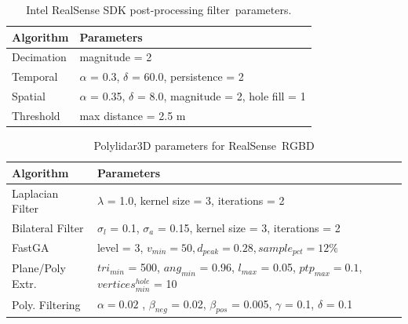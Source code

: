 \begin{table}[H]
\centering
\caption{Intel RealSense SDK post-processing filter~parameters.}\label{table:ch3_realsense_parameters}
\begin{tabular}{@{}ll@{}}
\toprule
\textbf{Algorithm}        & \textbf{Parameters}                                                          \\ \midrule
Decimation     & magnitude = 2   \\
Temporal      & $\alpha$ = 0.3, $\delta$ = 60.0, persistence = 2 \\
Spatial       & $\alpha$ = 0.35, $\delta$ = 8.0, magnitude = 2, hole fill = 1  \\
Threshold     & max distance = 2.5 m  \\ \bottomrule
\end{tabular}
\end{table}
\unskip

\begin{table}[H]
\centering
\caption{Polylidar3D parameters for RealSense~\ac{RGBD}}\label{table:ch3_rgbd_parameters}
\begin{tabular}{@{}ll@{}}
\toprule
\textbf{Algorithm}        & \textbf{Parameters}                                                          \\ \midrule
Laplacian Filter & $\lambda$ = 1.0, kernel size = 3, iterations = 2   \\
Bilateral Filter & $\sigma_l$ = 0.1, $\sigma_a$ = 0.15, kernel size = 3, iterations = 2 \\
FastGA           & level = 3,  $v_{min} = 50, d_{peak} = 0.28, sample_{pct} = 12\%$            \\
Plane/Poly Extr.      & $tri_{min}$ = 500, $ang_{min}$ = 0.96, $l_{max}$ = 0.05, $ptp_{max} = 0.1$, $vertices^{hole}_{min}$ = 10  \\
Poly. Filtering      & $\alpha = 0.02$ , $\beta_{neg}$ = 0.02, $\beta_{pos}$ = 0.005, $\gamma$ = 0.1, $\delta$ = 0.1      \\ \bottomrule
\end{tabular}
\end{table}


